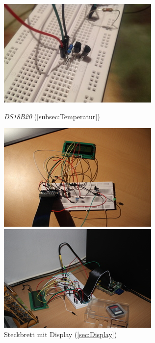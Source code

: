 \begin{figure}[h]
	\begin{minipage}[b]{0.45\textwidth}
		\centering
		\includegraphics[width=\textwidth]{figures/anschluss/1_1.jpg}
		\caption{\emph{DS18B20} (\ref{subsec:Temperatur})}
	\end{minipage}\hfill
	\begin{minipage}[b]{0.45\textwidth}
		\centering
		\includegraphics[width=\textwidth]{figures/anschluss/1_2.jpg}
		\caption{\gls{Steckbrett} mit Display (\ref{sec:Display})}
	\end{minipage}\hfill
	\begin{minipage}[b]{0.45\textwidth}
		\centering
		\includegraphics[width=\textwidth]{figures/anschluss/1_3.jpg}

\end{minipage}
\end{figure}
